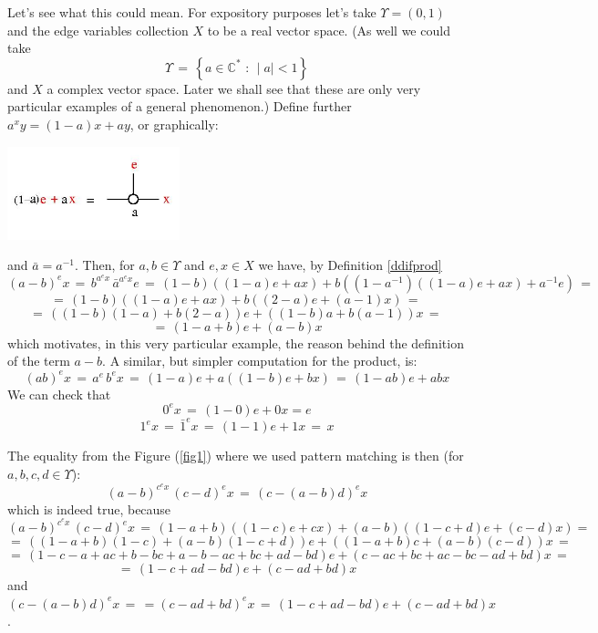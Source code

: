 \documentclass{article}
\begin{document}
Let's see what this could mean. For expository purposes let's take $\Upsilon = (0,1)$ and the edge variables collection $X$ to be a real vector space. (As well we could take 
$$\displaystyle \Upsilon \, = \,  \left\{ a \in \mathbb{C}^{*} \mbox{ : } \mid a \mid < 1 \right\}$$ and $X$ a complex vector space. Later we shall see that these are only very particular examples of a general phenomenon.) Define further $\displaystyle a^{x}y = (1-a)x + ay$, or graphically: 
\vspace{.5cm} 
\centerline{\includegraphics[width=50mm]{jpg/accept_0_1.jpg}} \vspace{.5cm}
and $\displaystyle \bar{a}=a^{-1}$. Then, for $a, b \in \Upsilon$ and $e, x \in X$ we have, by Definition \ref{ddifprod}
$$ (a-b)^{e} x \, = \,  b^{a^{e} x} \,  \bar{a}^{a^{e} x} e \, = \, (1-b) ((1-a) e + a x) + b ((1-a^{-1})((1-a)e + a x) + a^{-1}e) \, = \, $$ 
$$ = \, (1-b) ((1-a) e + a x) + b ((2-a)e + (a-1)x) \, = \, $$ $$ = \, ((1-b)(1-a) + b(2-a)) e + ((1-b)a + b(a-1))x \, = \, $$ 
$$ =\, (1-a+b)e + (a-b)x
$$ 
which motivates, in this very particular example, the reason behind the definition of the term $a-b$. A similar, but simpler computation for the product, is: 
$$(ab)^{e} x \, = \, a^{e} \, b^{e} x \, = \, (1-a) e + a((1-b)e + bx) \, = \, (1-ab)e + ab x$$
We can check that $$\displaystyle 0^{e} x \, = \, (1-0) e + 0 x = e$$  $$\displaystyle 1^{e} x \, = \, \bar{1}^{e} x \,  = \, (1-1)e + 1 x \, = \, x$$

The equality from the Figure (\ref{fig1}) where we used pattern matching is then (for $a, b, c, d \in \Upsilon$): 
$$ (a-b)^{c^{e} x} \, (c-d)^{e} x \, = \, (c-(a-b)d)^{e} x $$
which is indeed true, because
$$(a-b)^{c^{e} x} \, (c-d)^{e} x \, = \, (1-a+b) ((1-c) e + c x) + (a-b) ((1-c+d) e + (c-d)x) = \, $$ 
$$ = \, ((1-a+b)(1-c) + (a-b)(1-c+d)) e + ((1-a+b)c + (a-b)(c-d)) x \, = \,$$
$$ = \,  (1-c-a+ac+b-bc+a-b-ac+bc+ad-bd) e + (c-ac+bc+ac-bc-ad+bd)x \, = $$ 
$$ = \, (1-c+ad-bd) e + (c-ad+bd)x$$
and 
$\displaystyle (c-(a-b)d)^{e} x \, = \, = (c-ad+bd)^{e} x \, = \, (1-c+ad-bd) e + (c-ad+bd)x$. 

\vspace{.5cm}
\end{document}
